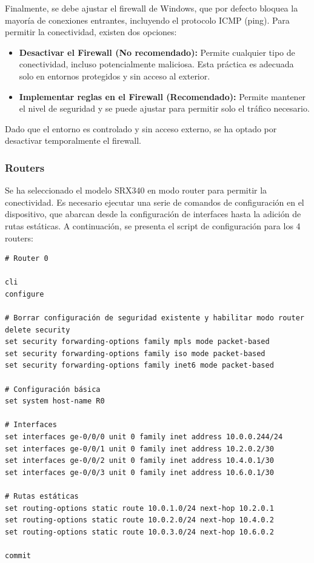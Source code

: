 \documentclass[%
    school=etsisi,%
    degree=61TI,%
]{upm-report}
\begin{document}
Finalmente, se debe ajustar el firewall de Windows, que por defecto bloquea la mayoría de conexiones entrantes, incluyendo el protocolo ICMP (ping). Para permitir la conectividad, existen dos opciones:
\begin{itemize}
    \item \textbf{Desactivar el Firewall (No recomendado):} Permite cualquier tipo de conectividad, incluso potencialmente maliciosa. Esta práctica es adecuada solo en entornos protegidos y sin acceso al exterior.
    \item \textbf{Implementar reglas en el Firewall (Recomendado):} Permite mantener el nivel de seguridad y se puede ajustar para permitir solo el tráfico necesario.
\end{itemize}

Dado que el entorno es controlado y sin acceso externo, se ha optado por desactivar temporalmente el firewall.

\subsubsection{Routers}

Se ha seleccionado el modelo SRX340 en modo router para permitir la conectividad. Es necesario ejecutar una serie de comandos de configuración en el dispositivo, que abarcan desde la configuración de interfaces hasta la adición de rutas estáticas. A continuación, se presenta el script de configuración para los 4 routers:

\begin{lstlisting}[breaklines]
# Router 0

cli
configure

# Borrar configuración de seguridad existente y habilitar modo router delete security
set security forwarding-options family mpls mode packet-based
set security forwarding-options family iso mode packet-based
set security forwarding-options family inet6 mode packet-based

# Configuración básica
set system host-name R0

# Interfaces
set interfaces ge-0/0/0 unit 0 family inet address 10.0.0.244/24
set interfaces ge-0/0/1 unit 0 family inet address 10.2.0.2/30
set interfaces ge-0/0/2 unit 0 family inet address 10.4.0.1/30
set interfaces ge-0/0/3 unit 0 family inet address 10.6.0.1/30

# Rutas estáticas
set routing-options static route 10.0.1.0/24 next-hop 10.2.0.1
set routing-options static route 10.0.2.0/24 next-hop 10.4.0.2
set routing-options static route 10.0.3.0/24 next-hop 10.6.0.2

commit
\end{lstlisting}
\end{document}
